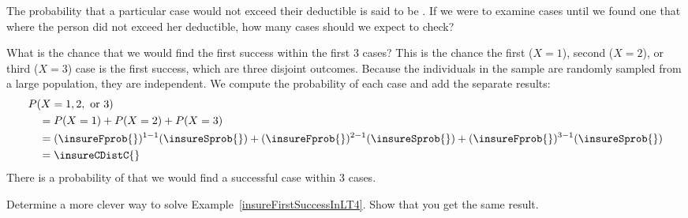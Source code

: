 \D{\newpage}

\begin{exercisewrap}
\begin{nexercise}
The probability that a particular case would not exceed their
deductible is said to be \insureSprob{}.
If we were to examine cases until we found one that where
the person did not exceed her deductible, how many cases should
we expect to check?\footnotemark{}
\end{nexercise}
\end{exercisewrap}

\begin{examplewrap}
\begin{nexample}{What is the chance that we would find
    the first success within the first 3 cases?}
  \label{insureFirstSuccessInLT4}%
  This is the chance the first ($X=1$), second ($X=2$),
  or third ($X=3$) case is the first success, which are three
  disjoint outcomes.
  Because the individuals in the sample are randomly sampled
  from a large population, they are independent.
  We compute the probability of each case and add the separate
  results:
  \begin{align*}
  &P(X=1, 2, \text{ or }3) \\
    & \quad = P(X=1)+P(X=2)+P(X=3) \\
    & \quad = (\insureFprob{})^{1-1}(\insureSprob{})
        + (\insureFprob{})^{2-1}(\insureSprob{})
        + (\insureFprob{})^{3-1}(\insureSprob{}) \\
    & \quad = \insureCDistC{}
  \end{align*}
  There is a probability of \insureCDistC{} that we would
  find a successful case within 3 cases.
\end{nexample}
\end{examplewrap}

\begin{exercisewrap}
\begin{nexercise}
Determine a more clever way to solve Example~\ref{insureFirstSuccessInLT4}.
Show that you get the same result.\footnotemark{}
\end{nexercise}
\end{exercisewrap}

